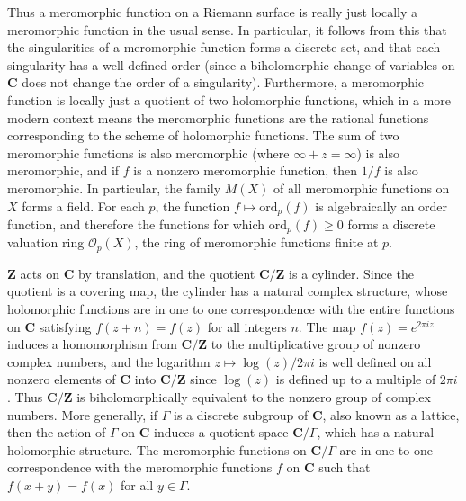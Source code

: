 Thus a meromorphic function on a Riemann surface is really just locally a meromorphic function in the usual sense. In particular, it follows from this that the singularities of a meromorphic function forms a discrete set, and that each singularity has a well defined order (since a biholomorphic change of variables on $\mathbf{C}$ does not change the order of a singularity). Furthermore, a meromorphic function is locally just a quotient of two holomorphic functions, which in a more modern context means the meromorphic functions are the rational functions corresponding to the scheme of holomorphic functions. The sum of two meromorphic functions is also meromorphic (where $\infty + z = \infty$) is also meromorphic, and if $f$ is a nonzero meromorphic function, then $1/f$ is also meromorphic. In particular, the family $M(X)$ of all meromorphic functions on $X$ forms a field. For each $p$, the function $f \mapsto \text{ord}_p(f)$ is algebraically an order function, and therefore the functions for which $\text{ord}_p(f) \geq 0$ forms a discrete valuation ring $\mathcal{O}_p(X)$, the ring of meromorphic functions finite at $p$.

\begin{example}
    $\mathbf{Z}$ acts on $\mathbf{C}$ by translation, and the quotient $\mathbf{C}/\mathbf{Z}$ is a cylinder. Since the quotient is a covering map, the cylinder has a natural complex structure, whose holomorphic functions are in one to one correspondence with the entire functions on $\mathbf{C}$ satisfying $f(z + n) = f(z)$ for all integers $n$. The map $f(z) = e^{2 \pi i z}$ induces a homomorphism from $\mathbf{C}/\mathbf{Z}$ to the multiplicative group of nonzero complex numbers, and the logarithm $z \mapsto \log(z)/2\pi i$ is well defined on all nonzero elements of $\mathbf{C}$ into $\mathbf{C}/\mathbf{Z}$ since $\log(z)$ is defined up to a multiple of $2 \pi i$. Thus $\mathbf{C}/\mathbf{Z}$ is biholomorphically equivalent to the nonzero group of complex numbers. More generally, if $\Gamma$ is a discrete subgroup of $\mathbf{C}$, also known as a lattice, then the action of $\Gamma$ on $\mathbf{C}$ induces a quotient space $\mathbf{C}/\Gamma$, which has a natural holomorphic structure. The meromorphic functions on $\mathbf{C}/\Gamma$ are in one to one correspondence with the meromorphic functions $f$ on $\mathbf{C}$ such that $f(x + y) = f(x)$ for all $y \in \Gamma$.
\end{example}

